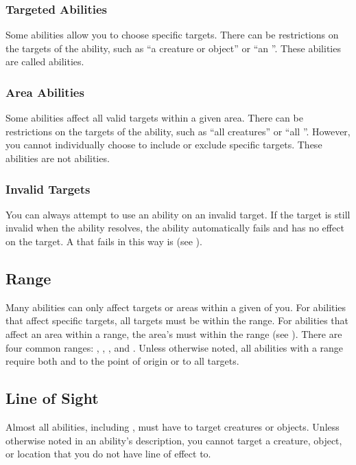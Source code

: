         \subsubsection{Targeted Abilities}\label{Targeted Abilities}
            Some abilities allow you to choose specific targets.
            There can be restrictions on the targets of the ability, such as ``a creature or object'' or ``an ''.
            These abilities are called  abilities.

        \subsubsection{Area Abilities}
            Some abilities affect all valid targets within a given area.
            There can be restrictions on the targets of the ability, such as ``all creatures'' or ``all ''.
            However, you cannot individually choose to include or exclude specific targets.
            These abilities are not  abilities.

        \subsubsection{Invalid Targets}
            You can always attempt to use an ability on an invalid target.
            If the target is still invalid when the ability resolves, the ability automatically fails and has no effect on the target.
            A  that fails in this way is  (see ).

    \subsection{Range}\label{Range}
        Many abilities can only affect targets or areas within a given  of you.
        For abilities that affect specific targets, all targets must be within the range.
        For abilities that affect an area within a range, the area's  must within the range (see ).
        There are four common ranges: \rngclose, \rngmed, \rnglong, and \rngext.
        Unless otherwise noted, all abilities with a range require both  and  to the point of origin or to all targets.

    \subsection{Line of Sight}\label{Line of Sight}
        Almost all abilities, including , must have  to target creatures or objects.
        Unless otherwise noted in an ability's description, you cannot target a creature, object, or location that you do not have line of effect to.

